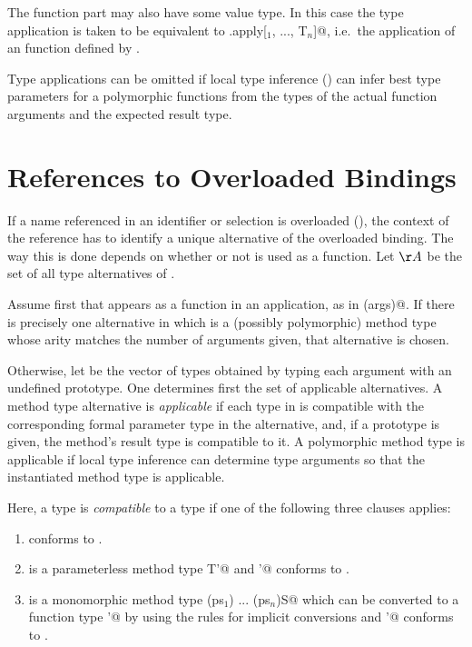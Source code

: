 \documentclass[11pt]{report}
\begin{document}
The function part \verb@f@ may also have some value type. In this case
the type application is taken to be equivalent to
\verb@f.apply[\verb@T$_1$, ..., T$_n$]@, i.e.\ the
application of an \verb@apply@ function defined by \verb@f@.

Type applications can be omitted if local type inference
() can infer best type parameters for a
polymorphic functions from the types of the actual function arguments
and the expected result type.

\section{References to Overloaded Bindings}
\label{sec:overloaded-refs}

If a name \verb@f@ referenced in an identifier or selection is
overloaded (), the context of the reference
has to identify a unique alternative of the overloaded binding. The
way this is done depends on whether or not \verb@f@ is used as a
function.  Let $\AA$ be the set of all type alternatives of
\verb@f@.

Assume first that \verb@f@ appears as a function in an application, as
in \verb@f(args)@.  If there is precisely one alternative in
\verb@\AA@ which is a (possibly polymorphic) method type whose arity
matches the number of arguments given, that alternative is chosen.

Otherwise, let \verb@argtypes@ be the vector of types obtained by
typing each argument with an undefined prototype. One determines first
the set of applicable alternatives. A method type alternative is {\em
applicable} if each type in \verb@argtypes@ is compatible with the
corresponding formal parameter type in the alternative, and, if a
prototype is given, the method's result type is compatible to it.  A
polymorphic method type is applicable if local type inference can
determine type arguments so that the instantiated method type is
applicable.

Here, a type \verb@T@ is {\em compatible} to a type \verb@U@ if one of the
following three clauses applies:
\begin{enumerate}
\item
\verb@T@ conforms to \verb@U@.
\item
\verb@T@ is a parameterless method type \verb@[]T'@ and \verb@T'@
conforms to \verb@U@.
\item 
\verb@T@ is a monomorphic method type \verb@(ps$_1$) ... (ps$_n$)S@ which
can be converted to a function type \verb@T'@ by using the rules for
implicit conversions  and \verb@T'@ conforms to
\verb@U@.
\end{enumerate}
\end{document}
